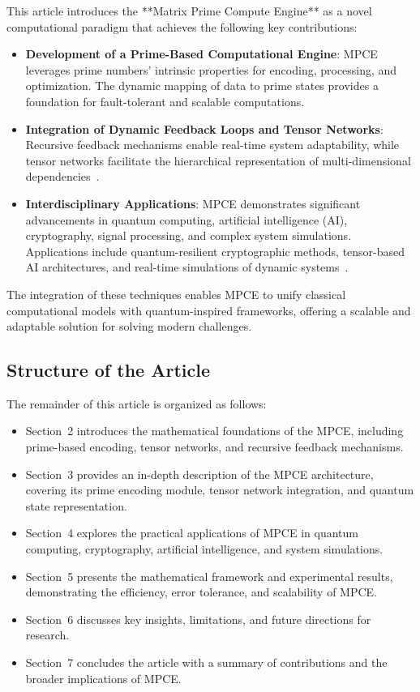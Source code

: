 \documentclass{article}
\theoremstyle{plain}
\begin{document}
This article introduces the **Matrix Prime Compute Engine** as a novel computational paradigm that achieves the following key contributions:

\begin{itemize}
    \item \textbf{Development of a Prime-Based Computational Engine}: MPCE leverages prime numbers' intrinsic properties for encoding, processing, and optimization. The dynamic mapping of data to prime states provides a foundation for fault-tolerant and scalable computations.
    \item \textbf{Integration of Dynamic Feedback Loops and Tensor Networks}: Recursive feedback mechanisms enable real-time system adaptability, while tensor networks facilitate the hierarchical representation of multi-dimensional dependencies~\cite{white1992tensor}.
    \item \textbf{Interdisciplinary Applications}: MPCE demonstrates significant advancements in quantum computing, artificial intelligence (AI), cryptography, signal processing, and complex system simulations. Applications include quantum-resilient cryptographic methods, tensor-based AI architectures, and real-time simulations of dynamic systems~\cite{grover1996fast, wang2021quantum}.
\end{itemize}

The integration of these techniques enables MPCE to unify classical computational models with quantum-inspired frameworks, offering a scalable and adaptable solution for solving modern challenges.

\subsection{Structure of the Article}

The remainder of this article is organized as follows:

\begin{itemize}
    \item Section~2 introduces the mathematical foundations of the MPCE, including prime-based encoding, tensor networks, and recursive feedback mechanisms.
    \item Section~3 provides an in-depth description of the MPCE architecture, covering its prime encoding module, tensor network integration, and quantum state representation.
    \item Section~4 explores the practical applications of MPCE in quantum computing, cryptography, artificial intelligence, and system simulations.
    \item Section~5 presents the mathematical framework and experimental results, demonstrating the efficiency, error tolerance, and scalability of MPCE.
    \item Section~6 discusses key insights, limitations, and future directions for research.
    \item Section~7 concludes the article with a summary of contributions and the broader implications of MPCE.
\end{itemize}
\end{document}

